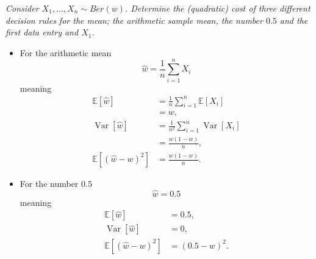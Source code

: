 \begin{example}
	\emph{Consider $X_1,\dots, X_n\sim Ber(w)$. Determine the (quadratic) cost of three different decision rules for the mean; the arithmetic sample mean, the number $0.5$ and the first data entry and $X_1$.}\newline
	
	\begin{itemize}
		\item For the arithmetic mean
		\begin{equation}
			\hat{w}=\frac{1}{n}\sum_{i=1}^nX_i
		\end{equation}
		meaning
		\begin{equation}
			\begin{split}
				\mathbb{E}[\hat{w}] & = \frac{1}{n}\sum_{i=1}^n\mathbb{E}[X_i]\\
				&=w,\\
				\operatorname{Var}[\hat{w}]	&= \frac{1}{n^2}\sum_{i=1}^n\operatorname{Var}[X_i]\\
				& = \frac{w(1-w)}{n},\\
				\mathbb{E}[(\hat{w}-w)^2]&=\frac{w(1-w)}{n}.
			\end{split} 
		\end{equation}
		
		\item For the number $0.5$ 
		\begin{equation}
			\hat{w}=0.5
		\end{equation}
		meaning
		\begin{equation}
			\begin{split}
				\mathbb{E}[\hat{w}] & = 0.5,\\
				\operatorname{Var}[\hat{w}]	&= 0,\\
				\mathbb{E}[(\hat{w}-w)^2]&=(0.5-w)^2.
			\end{split} 
		\end{equation}
		

\end{itemize}
\end{example}
